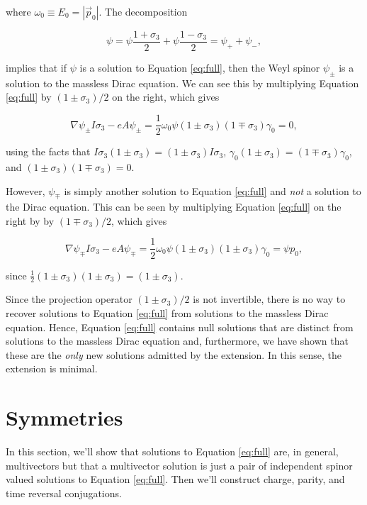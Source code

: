 \documentclass{article}
\begin{document}
  where $\omega_0 \equiv E_0 = |\vec p_0|$. The decomposition

  \begin{equation}
    \psi = \psi \frac{1 + \sigma_3}{2} + \psi \frac{1 - \sigma_3}{2} = \psi_+ + \psi_-,
  \end{equation}

  implies that if $\psi$ is a solution to Equation \ref{eq:full}, then the Weyl spinor $\psi_\pm$ is a solution to the massless Dirac equation. We can see this by multiplying Equation \ref{eq:full} by $(1 \pm \sigma_3)/2$ on the right, which gives

  \begin{equation}
    \nabla \psi_\pm I \sigma_3 - e A \psi_\pm = \frac{1}{2} \omega_0 \psi (1 \pm \sigma_3)(1 \mp \sigma_3) \gamma_0 = 0,
  \end{equation}

  using the facts that $I \sigma_3 (1 \pm \sigma_3) = (1 \pm \sigma_3) I \sigma_3$, $\gamma_0 (1 \pm \sigma_3) = (1 \mp \sigma_3)\gamma_0$, and $(1 \pm \sigma_3) (1 \mp \sigma_3) = 0$.

  However, $\psi_\mp$ is simply another solution to Equation \ref{eq:full} and \emph{not} a solution to the Dirac equation. This can be seen by multiplying Equation \ref{eq:full} on the right by by $(1 \mp \sigma_3)/2$, which gives

  \begin{equation}
    \nabla \psi_\mp I \sigma_3 - e A \psi_\mp = \frac{1}{2} \omega_0 \psi(1 \pm \sigma_3)(1 \pm \sigma_3) \gamma_0 = \psi p_0,
  \end{equation}

  since $\frac{1}{2}(1 \pm \sigma_3)(1 \pm \sigma_3) = (1 \pm \sigma_3)$.

  Since the projection operator $(1 \pm \sigma_3)/2$ is not invertible, there is no way to recover solutions to Equation \ref{eq:full} from solutions to the massless Dirac equation. Hence, Equation \ref{eq:full} contains null solutions that are distinct from solutions to the massless Dirac equation and, furthermore, we have shown that these are the \emph{only} new solutions admitted by the extension. In this sense, the extension is minimal.

  \section{Symmetries} \label{symmetries}

  In this section, we'll show that solutions to Equation \ref{eq:full} are, in general, multivectors but that a multivector solution is just a pair of independent spinor valued solutions to Equation \ref{eq:full}. Then we'll construct charge, parity, and time reversal conjugations.
\end{document}
